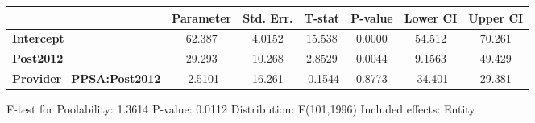 \begin{center}
\begin{tabular}{lclc}
\bottomrule
\end{tabular}
\begin{tabular}{lcccccc}
                                 & \textbf{Parameter} & \textbf{Std. Err.} & \textbf{T-stat} & \textbf{P-value} & \textbf{Lower CI} & \textbf{Upper CI}  \\
\midrule
\textbf{Intercept}               &       62.387       &       4.0152       &      15.538     &      0.0000      &       54.512      &       70.261       \\
\textbf{Post2012}                &       29.293       &       10.268       &      2.8529     &      0.0044      &       9.1563      &       49.429       \\
\textbf{Provider\_PPSA:Post2012} &      -2.5101       &       16.261       &     -0.1544     &      0.8773      &      -34.401      &       29.381       \\
\bottomrule
\end{tabular}
\end{center}

F-test for Poolability: 1.3614 \newline
 P-value: 0.0112 \newline
 Distribution: F(101,1996) \newline
  \newline
 Included effects: Entity